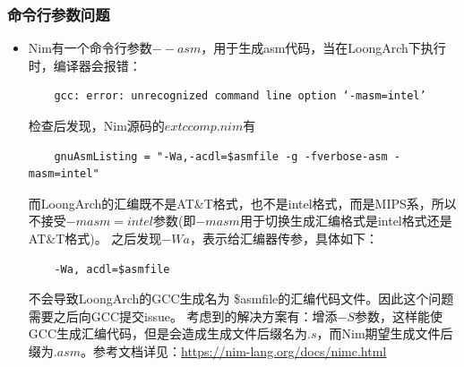 \documentclass[UTF8]{ctexart}
\begin{document}
		\subsubsection{命令行参数问题} %
		\begin{itemize}[leftmargin=3.5em]
			\item Nim有一个命令行参数$ --asm $，用于生成asm代码，当在LoongArch下执行时，编译器会报错：
			\begin{tcolorbox}[colback=gray!20, colframe=gray!20, rounded corners, boxrule=-5pt, height=0.01\textheight, width=0.73\textwidth, left=0pt, right=0pt, top=0pt, bottom=0pt]
				\begin{verbatim}
	gcc: error: unrecognized command line option ‘-masm=intel’
				\end{verbatim}
			\end{tcolorbox}
			检查后发现，Nim源码的$ extccomp.nim $有
			\begin{tcolorbox}[colback=gray!20, colframe=gray!20, rounded corners, boxrule=-5pt, height=0.01\textheight, width=0.8\textwidth, left=0pt, right=0pt, top=0pt, bottom=0pt]
				\begin{verbatim}
	gnuAsmListing = "-Wa,-acdl=$asmfile -g -fverbose-asm -masm=intel"
				\end{verbatim}
			\end{tcolorbox}
			而LoongArch的汇编既不是AT\&T格式，也不是intel格式，而是MIPS系，所以不接受$ -masm=intel $参数(即$ -masm $用于切换生成汇编格式是intel格式还是AT\&T格式)。
			之后发现$ -Wa $，表示给汇编器传参，具体如下： \\
			\begin{tcolorbox}[colback=gray!20, colframe=gray!20, rounded corners, boxrule=-5pt, height=0.01\textheight, width=0.24\textwidth, left=0pt, right=0pt, top=0pt, bottom=0pt]
				\begin{verbatim}
	-Wa, acdl=$asmfile
				\end{verbatim}
			\end{tcolorbox}
			不会导致LoongArch的GCC生成名为 \$asmfile的汇编代码文件。因此这个问题需要之后向GCC提交issue。
			考虑到的解决方案有：增添$ -S $参数，这样能使GCC生成汇编代码，但是会造成生成文件后缀名为$ .s $，而Nim期望生成文件后缀为$ .asm $。参考文档详见：\underline{\url{https://nim-lang.org/docs/nimc.html}}
		\end{itemize}
\end{document}
